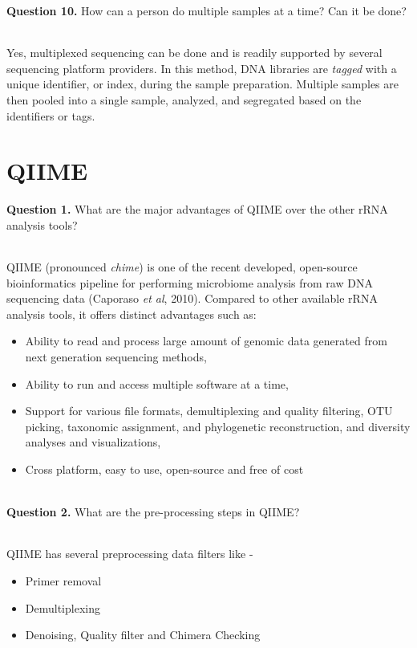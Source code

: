 \documentclass[12pt,a4paper]{report}
\begin{document}
\noindent
\textbf{Question 10.} How can a person do multiple samples at a time? Can it be 
done?
\subparagraph{} Yes, multiplexed sequencing can be done and is readily 
supported by several sequencing platform providers. In this method, DNA 
libraries are \textit{tagged} with a unique identifier, or index, during the 
sample preparation. Multiple samples are then pooled into a single sample, 
analyzed, and segregated based on the identifiers or tags.\mbox{}\\

\chapter*{QIIME}
\textbf{Question 1.} What are the major advantages of QIIME over the other rRNA 
analysis tools?
\subparagraph{}
QIIME (pronounced \textit{chime}) is one of the recent 
developed, open-source bioinformatics pipeline for performing microbiome 
analysis from raw DNA sequencing data (Caporaso \textit{et al}, 2010). Compared 
to other available rRNA analysis tools, it offers distinct advantages such as:
\begin{itemize}
    \item{Ability to read and process large amount of genomic data generated 
    from next generation sequencing methods,}
	\item{Ability to run and access multiple software at a time,}
    \item{Support for various file formats, demultiplexing and quality 
    filtering, OTU picking, taxonomic assignment, and phylogenetic 
    reconstruction, and diversity analyses and visualizations,}
	\item{Cross platform, easy to use, open-source and free of cost}
\end{itemize} \mbox{}\\


\noindent
\textbf{Question 2.} What are the pre-processing steps in QIIME?
\subparagraph{} QIIME has several preprocessing data filters like -
\begin{itemize}
    \item Primer removal
    \item Demultiplexing
    \item Denoising, Quality filter and Chimera Checking
\end{itemize}\mbox{}\\
\end{document}
